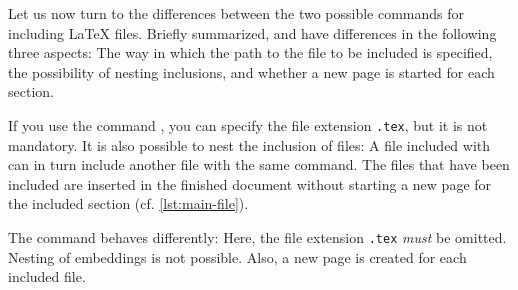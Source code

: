 Let us now turn to the differences between the two possible commands for including \LaTeX{} files. Briefly summarized, \texttt{} and \texttt{} have differences in the following three aspects: The way in which the path to the file to be included is specified, the possibility of nesting inclusions, and whether a new page is started for each section.

If you use the command \texttt{}, you can specify the file extension \texttt{.tex}, but it is not mandatory. It is also possible to nest the inclusion of files: A file included with \texttt{} can in turn include another file with the same command. The files that have been included are inserted in the finished document without starting a new page for the included section (cf. \cref{lst:main-file}).

The command \texttt{} behaves differently: Here, the file 
extension \texttt{.tex} \emph{must} be omitted. Nesting of embeddings is not 
possible. Also, a new page is created for each included file.
